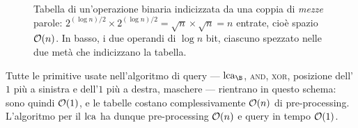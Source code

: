 \begin{figure}[H]
  \centering
  
  \caption{Tabella di un'operazione binaria indicizzata da una coppia di \emph{mezze}
    parole: $2^{(\log n)/2}\times 2^{(\log n)/2}=\sqrt n\times\sqrt n=n$ entrate, cioè
    spazio $\mathcal{O}(n)$. In basso, i due operandi di $\log n$ bit, ciascuno spezzato nelle
    due metà che indicizzano la tabella.}
  \label{fig:tabella-op-binarie}
\end{figure}

\begin{osservazione}
  Tutte le primitive usate nell'algoritmo di query --- $\lca_{\B}$, \textsc{and},
  \textsc{xor}, posizione dell'$1$ più a sinistra e dell'$1$ più a destra, maschere ---
  rientrano in questo schema: sono quindi $\mathcal{O}(1)$, e le tabelle costano
  complessivamente $\mathcal{O}(n)$ di pre-processing. L'algoritmo per il $\operatorname{lca}$ ha dunque
  pre-processing $\mathcal{O}(n)$ e query in tempo $\mathcal{O}(1)$.
\end{osservazione}
